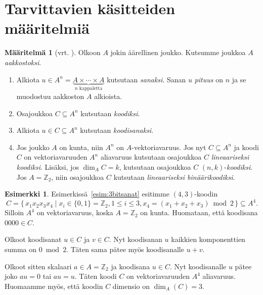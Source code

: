 \documentclass[a4paper,12pt,leqno,oneside]{report} %
\theoremstyle{plain}
\theoremstyle{plain}
\theoremstyle{definition}
\newtheorem{maaritelma}{Määritelmä}[chapter]
\newtheorem{esimerkki}{Esimerkki}[chapter]
\theoremstyle{remark}
\numberwithin{equation}{chapter}
\newcommand*{\Zset}{\mathbb{Z}}  %
\begin{document}
    \section{Tarvittavien käsitteiden määritelmiä}
    \begin{maaritelma}[vrt. {\cite[s.~491]{PA}}]\label{maar:tarvittavat}
        Olkoon $A$ jokin äärellinen joukko. Kutsumme joukkoa $A$ \emph{aakkostoksi}.

        \begin{enumerate}
            \item Alkiota $u \in  A^n = \underbrace{A \times \cdots \times A}_{
                \text{$n$ kappaletta}}$ kutsutaan \emph{sanaksi}. Sanan $u$ \emph{pituus} on $n$ ja se muodostuu aakkoston $A$ alkioista.
            \item Osajoukkoa $C \subseteq A^n$ kutsutaan \emph{koodiksi}.
            \item Alkiota $u \in C \subseteq A^n$ kutsutaan \emph{koodisanaksi}.
            \item\label{kht:linkoodi} Jos joukko $A$ on kunta, niin $A^n$ on $A$-vektoriavaruus. Jos nyt $C \subseteq A^n$ ja koodi $C$ on vektoriavaruuden $A^n$ aliavaruus kutsutaan osajoukkoa $C$ \emph{lineaariseksi koodiksi}. Lisäksi, jos $\dim_A C = k$, kutsutaan osajoukkoa $C$ $(n, k)$-\emph{koodiksi}. Jos $A = \Zset_2$, niin osajoukkoa $C$ kutsutaan \emph{lineaariseksi binäärikoodiksi}.
        \end{enumerate}
    \end{maaritelma}

    \begin{esimerkki}\label{esim:todaliav}
        Esimerkissä~\ref{esim:3bitsanat} esitimme $(4,3)$-koodin
        \[
            C = \{\, x_1x_2x_3x_4 \mid  x_i \in \{0,1\} = \Zset_2, 1 \le i \le 3, x_4 = (x_1 + x_2 + x_3) \bmod2\,\} \subseteq A^4.
        \]
        Silloin $A^4$ on vektoriavaruus, koska $A = \Zset_2$ on kunta. Huomataan, että koodisana $0000 \in C$. 

        Olkoot koodisanat $u \in C$ ja $v \in C$. Nyt koodisanan $u$ kaikkien komponenttien summa on $0 \bmod2$. Täten sama pätee myös koodisanalle $u + v$. 
        
        Olkoot sitten skalaari $a \in A = \Zset_2$ ja koodisana $u \in C$. Nyt koodisanalle $u$ pätee joko $au = 0$ tai $au = u$. Täten koodi $C$ on vektoriavaruuden $A^4$ aliavaruus. Huomaamme myös, että koodin $C$ dimensio on $\dim_A(C) = 3$.
    \end{esimerkki}
\end{document}
